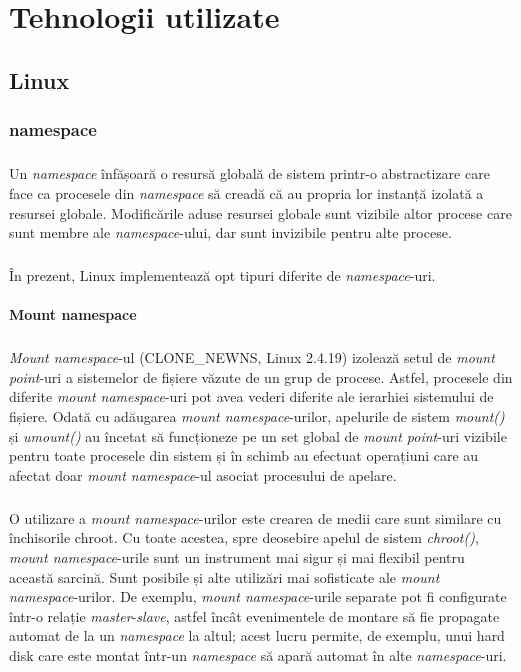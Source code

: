 \chapter{Tehnologii utilizate}

\section{Linux}
    \subsection{namespace}
        \paragraph{} Un \textit{namespace} înfășoară o resursă globală de sistem printr-o abstractizare care face ca procesele din \textit{namespace} să creadă că au propria lor instanță izolată a resursei globale. Modificările aduse resursei globale sunt vizibile altor procese care sunt membre ale \textit{namespace}-ului, dar sunt invizibile pentru alte procese.\cite{ns:man}
        \paragraph{} În prezent, Linux implementează opt tipuri diferite de \textit{namespace}-uri.

        \subsubsection{Mount namespace}
            \paragraph{} \textit{Mount namespace}-ul (CLONE\_NEWNS, Linux 2.4.19) izolează setul de \textit{mount point}-uri a sistemelor de fișiere văzute de un grup de procese. Astfel, procesele din diferite \textit{mount namespace}-uri pot avea vederi diferite ale ierarhiei sistemului de fișiere. Odată cu adăugarea \textit{mount namespace}-urilor, apelurile de sistem \textit{mount()} și \textit{umount()} au încetat să funcționeze pe un set global de \textit{mount point}-uri vizibile pentru toate procesele din sistem și în schimb au efectuat operațiuni care au afectat doar \textit{mount namespace}-ul asociat procesului de apelare. \cite{ns:lwn}
            \paragraph{} O utilizare a \textit{mount namespace}-urilor este crearea de medii care sunt similare cu închisorile chroot. Cu toate acestea, spre deosebire apelul de sistem \textit{chroot()}, \textit{mount namespace}-urile sunt un instrument mai sigur și mai flexibil pentru această sarcină. Sunt posibile și alte utilizări mai sofisticate ale \textit{mount namespace}-urilor. De exemplu, \textit{mount namespace}-urile separate pot fi configurate într-o relație \textit{master}-\textit{slave}, astfel încât evenimentele de montare să fie propagate automat de la un \textit{namespace} la altul; acest lucru permite, de exemplu, unui hard disk care este montat într-un \textit{namespace} să apară automat în alte \textit{namespace}-uri. \cite{ns:lwn}
